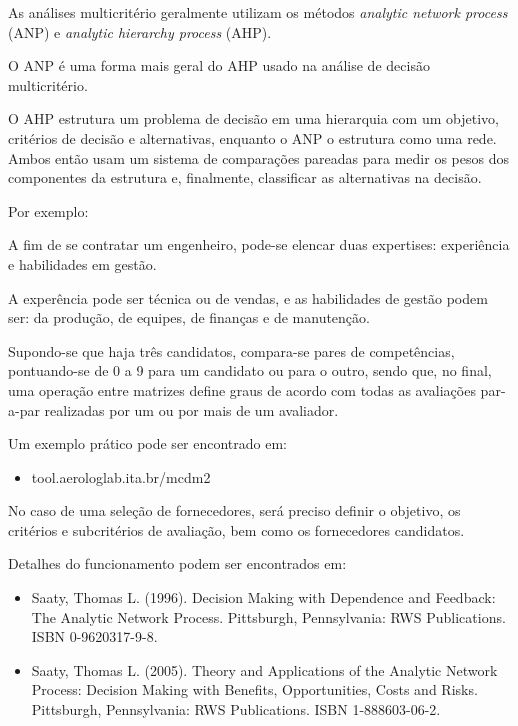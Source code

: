 \documentclass{article}
\begin{document}
As análises multicritério geralmente utilizam os métodos {\it analytic network process} (ANP) e {\it analytic hierarchy process} (AHP).

O ANP é uma forma mais geral do AHP usado na análise de decisão multicritério.

O AHP estrutura um problema de decisão em uma hierarquia com um objetivo, critérios de decisão e alternativas, enquanto o ANP o estrutura como uma rede. Ambos então usam um sistema de comparações pareadas para medir os pesos dos componentes da estrutura e, finalmente, classificar as alternativas na decisão.

Por exemplo:

A fim de se contratar um engenheiro, pode-se elencar duas expertises: experiência e habilidades em gestão.

A experência pode ser técnica ou de vendas, e as habilidades de gestão podem ser: da produção, de equipes, de finanças e de manutenção.

Supondo-se que haja três candidatos, compara-se pares de competências, pontuando-se de 0 a 9 para um candidato ou para o outro, sendo que, no final, uma operação entre matrizes define graus de acordo com todas as avaliações par-a-par realizadas por um ou por mais de um avaliador.

Um exemplo prático pode ser encontrado em:

\begin{itemize}
\item tool.aerologlab.ita.br/mcdm2
\end{itemize}

No caso de uma seleção de fornecedores, será preciso definir o objetivo, os critérios e subcritérios de avaliação, bem como os fornecedores candidatos.

Detalhes do funcionamento podem ser encontrados em:

\begin{itemize}
\item Saaty, Thomas L. (1996). Decision Making with Dependence and Feedback: The Analytic Network Process. Pittsburgh, Pennsylvania: RWS Publications. ISBN 0-9620317-9-8.

\item Saaty, Thomas L. (2005). Theory and Applications of the Analytic Network Process: Decision Making with Benefits, Opportunities, Costs and Risks. Pittsburgh, Pennsylvania: RWS Publications. ISBN 1-888603-06-2.
\end{itemize}
\end{document}
